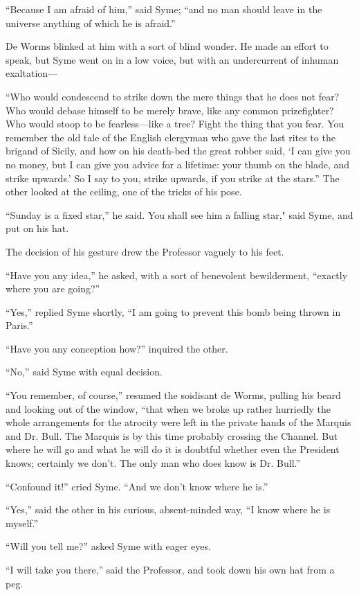 \documentclass{book}
\begin{document}
“Because I am afraid of him,” said Syme; “and no man should leave in the universe anything of which he is afraid.”

De Worms blinked at him with a sort of blind wonder. He made an effort to speak, but Syme went on in a low voice, but with an undercurrent of inhuman exaltation—

“Who would condescend to strike down the mere things that he does not fear? Who would debase himself to be merely brave, like any common prizefighter? Who would stoop to be fearless—like a tree? Fight the thing that you fear. You remember the old tale of the English clergyman who gave the last rites to the brigand of Sicily, and how on his death-bed the great robber said, ‘I can give you no money, but I can give you advice for a lifetime: your thumb on the blade, and strike upwards.’ So I say to you, strike upwards, if you strike at the stars.” The other looked at the ceiling, one of the tricks of his pose.

“Sunday is a fixed star,” he said. You shall see him a falling star," said Syme, and put on his hat.

The decision of his gesture drew the Professor vaguely to his feet.

“Have you any idea,” he asked, with a sort of benevolent bewilderment, “exactly where you are going?”

“Yes,” replied Syme shortly, “I am going to prevent this bomb being thrown in Paris.”

“Have you any conception how?” inquired the other.

“No,” said Syme with equal decision.

“You remember, of course,” resumed the soidisant de Worms, pulling his beard and looking out of the window, “that when we broke up rather hurriedly the whole arrangements for the atrocity were left in the private hands of the Marquis and Dr. Bull. The Marquis is by this time probably crossing the Channel. But where he will go and what he will do it is doubtful whether even the President knows; certainly we don’t. The only man who does know is Dr. Bull.”

“Confound it!” cried Syme. “And we don’t know where he is.”

“Yes,” said the other in his curious, absent-minded way, “I know where he is myself.”

“Will you tell me?” asked Syme with eager eyes.

“I will take you there,” said the Professor, and took down his own hat from a peg.
\end{document}
